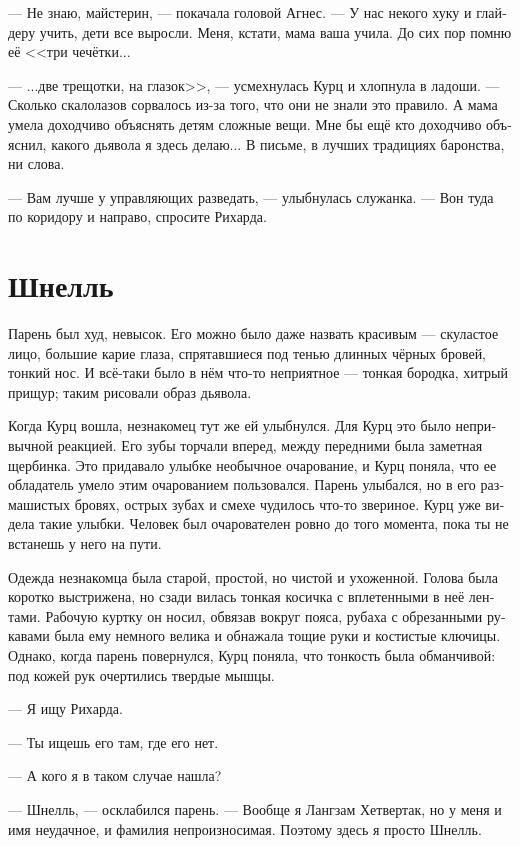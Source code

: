 \documentclass[a4paper,12pt,fleqn]{book}\usepackage{cooltooltips}\usepackage{polyglossia}\setdefaultlanguage[babelshorthands=true]{russian}\setotherlanguage{english}\defaultfontfeatures{Ligatures=TeX,Mapping=tex-text} \usepackage{xcolor}\definecolor{lightgray}{HTML}{bbbbbb}\color{lightgray}\newcommand{\ml}[3]{\textenglish{\textcolor{black}{#3}}}
\begin{document}
--- Не знаю, майстерин, --- покачала головой Агнес.
--- У нас некого хуку и глайдеру учить, дети все выросли.
Меня, кстати, мама ваша учила.
До сих пор помню её <<три чечётки...

--- ...две трещотки, на глазок>>, --- усмехнулась Курц и хлопнула в ладоши.
--- Сколько скалолазов сорвалось из-за того, что они не знали это правило.
А мама умела доходчиво объяснять детям сложные вещи.
Мне бы ещё кто доходчиво объяснил, какого дьявола я здесь делаю...
В письме, в лучших традициях баронства, ни слова.

--- Вам лучше у управляющих разведать, --- улыбнулась служанка.
--- Вон туда по коридору и направо, спросите Рихарда.

\section{Шнелль}

Парень был худ, невысок.
Его можно было даже назвать красивым --- скуластое лицо, большие карие глаза, спрятавшиеся под тенью длинных чёрных бровей, тонкий нос.
И всё-таки было в нём что-то неприятное --- тонкая бородка, хитрый прищур;
таким рисовали образ дьявола.

Когда Курц вошла, незнакомец тут же ей улыбнулся.
Для Курц это было непривычной реакцией.
Его зубы торчали вперед, между передними была заметная щербинка.
Это придавало улыбке необычное очарование, и Курц поняла, что ее обладатель умело этим очарованием пользовался.
Парень улыбался, но в его размашистых бровях, острых зубах и смехе чудилось что-то звериное.
Курц уже видела такие улыбки.
Человек был очарователен ровно до того момента, пока ты не встанешь у него на пути.

Одежда незнакомца была старой, простой, но чистой и ухоженной.
Голова была коротко выстрижена, но сзади вилась тонкая косичка с вплетенными в неё лентами.
Рабочую куртку он носил, обвязав вокруг пояса, рубаха с обрезанными рукавами была ему немного велика и обнажала тощие руки и костистые ключицы.
Однако, когда парень повернулся, Курц поняла, что тонкость была обманчивой: под кожей рук очертились твердые мышцы. 

--- Я ищу Рихарда.

--- Ты ищешь его там, где его нет.

--- А кого я в таком случае нашла?

--- Шнелль, --- осклабился парень.
--- Вообще я Лангзам Хетвертак, но у меня и имя неудачное, и фамилия непроизносимая.
Поэтому здесь я просто Шнелль.
\end{document}
